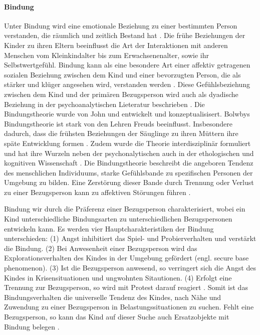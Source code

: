 \paragraph{Bindung}\label{par:Bindung}
Unter Bindung wird eine emotionale Beziehung zu einer bestimmten Person verstanden, die räumlich und zeitlich Bestand hat \cite[S.~585ff]{Siegler2008}. Die frühe Beziehungen der Kinder zu ihren Eltern beeinflusst die Art der Interaktionen mit anderen Menschen vom Kleinkindalter bis zum Erwachsenenalter, sowie ihr Selbstwertgefühl. Bindung kann als eine besondere Art einer affektiv getragenen sozialen Beziehung zwischen dem Kind und einer bevorzugten Person, die als stärker und klüger angesehen wird, verstanden werden \cite{Biringen1994}. Diese Gefühlsbeziehung zwischen dem Kind und der primären Bezugsperson wird auch als dyadische Beziehung in der psychoanalytischen Lieteratur beschrieben \cite{Resch1999}. Die Bindungstheorie wurde von John  und  entwickelt und konzeptualisisert. Bolwbys Bindungstheorie ist stark von den Lehren Freuds beeinflusst. Insbesondere dadurch, dass die frühsten Beziehungen der Säuglinge zu ihren Müttern ihre späte Entwicklung formen \cite{Siegler2008}. Zudem wurde die Theorie interdisziplinär formuliert und hat ihre Wurzeln neben der psychonalytischen auch in der ethologischen und kognitiven Wissenschaft \cite{Resch1999}. Die Bindungstheorie beschreibt die angeboren Tendenz des menschlichen Individuums, starke Gefühlsbande zu spezifischen Personen der Umgebung zu bilden. Eine Zerstörung dieser Bande durch Trennung oder Verlust zu einer Bezugsperson kann zu affektiven Störungen führen \cite{Resch1999}. 

Bindung wir durch die Präferenz einer Bezugsperson charakterisiert, wobei ein Kind unterschiedliche Bindungsarten zu unterschiedlichen Bezugspersonen entwickeln kann. Es werden vier Hauptcharakteristiken der Bindung unterschieden: (1) Angst inhibitiert das Spiel- und Probierverhalten und verstärkt die Bindung. (2) Bei Anwesenheit einer Bezugsperson wird das Explorationsverhalten des Kindes in der Umgebung gefördert (engl. secure base phenomenon). (3) Ist die Bezugsperson anwesend, so verringert sich die Angst des Kindes in Krisensituationen und ungwohnten Sitautionen. (4) Erfolgt eine Trennung zur Bezugsperson, so wird mit Protest darauf reagiert \cite{Resch1999}. Somit ist das Bindungsverhalten die universelle Tendenz des Kindes, nach Nähe und Zuwendung zu einer Bezugsperson in Belastungssituationen zu suchen. Fehlt eine Bezugsperson, so kann das Kind auf dieser Suche auch Ersatzobjekte mit Bindung belegen \cite{Resch1999}.

